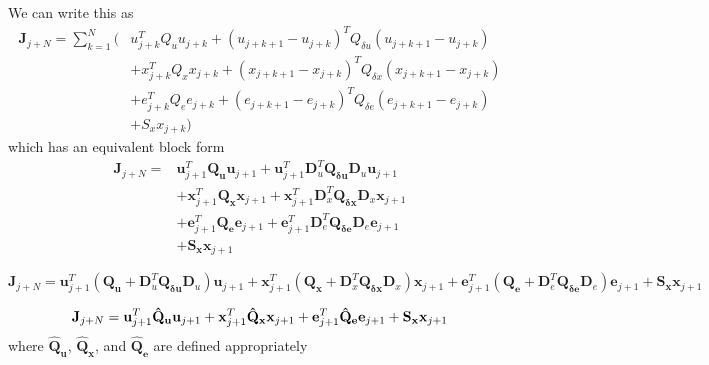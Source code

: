 \documentclass{article}
\begin{document}
We can write this as
\begin{equation}
\begin{split}
\mathbf{J}_{j+N} 
= \sum_{k=1}^{N}(
& u_{j+k}^T Q_u u_{j+k} + \left(u_{j+k+1}-u_{j+k}\right)^T Q_{\delta u} \left(u_{j+k+1}-u_{j+k}\right) \\
& + x_{j+k}^T Q_x x_{j+k} + \left(x_{j+k+1}-x_{j+k}\right)^T Q_{\delta x} \left(x_{j+k+1}-x_{j+k}\right) \\
& + e_{j+k}^T Q_e e_{j+k} + \left(e_{j+k+1}-e_{j+k}\right)^T Q_{\delta e} \left(e_{j+k+1}-e_{j+k}\right) \\
& + S_x x_{j+k})
\end{split}
\end{equation}
which has an equivalent block form
\begin{equation}
\begin{split}
\mathbf{J}_{j+N} = 
& \mathbf{u}_{j+1}^T \mathbf{Q_u} \mathbf{u}_{j+1} + \mathbf{u}_{j+1}^T \mathbf{D}_u^T \mathbf{Q_{\delta u}} \mathbf{D}_u \mathbf{u}_{j+1}\\
&+\mathbf{x}_{j+1}^T \mathbf{Q_x} \mathbf{x}_{j+1} + \mathbf{x}_{j+1}^T \mathbf{D}_x^T \mathbf{Q_{\delta x}} \mathbf{D}_x \mathbf{x}_{j+1}\\
&+\mathbf{e}_{j+1}^T \mathbf{Q_e} \mathbf{e}_{j+1} + \mathbf{e}_{j+1}^T \mathbf{D}_e^T \mathbf{Q_{\delta e}} \mathbf{D}_e \mathbf{e}_{j+1}\\
&+\mathbf{S_x}\mathbf{x}_{j+1}
\end{split}
\end{equation}

\begin{equation}
\mathbf{J}_{j+N} = 
 \mathbf{u}_{j+1}^T \left(\mathbf{Q_u} + \mathbf{D}_u^T\mathbf{Q_{\delta u}} \mathbf{D}_u\right) \mathbf{u}_{j+1}
+\mathbf{x}_{j+1}^T \left(\mathbf{Q_x} + \mathbf{D}_x^T\mathbf{Q_{\delta x}} \mathbf{D}_x \right)\mathbf{x}_{j+1}
+\mathbf{e}_{j+1}^T \left(\mathbf{Q_e} + \mathbf{D}_e^T\mathbf{Q_{\delta e}} \mathbf{D}_e \right)\mathbf{e}_{j+1}
+\mathbf{S_x}\mathbf{x}_{j+1}
\end{equation}

\begin{equation}
\mathbf{J}_{j+N} = 
\mathbf{u}_{j+1}^T \mathbf{\hat{Q}_u} \mathbf{u}_{j+1}\\
+\mathbf{x}_{j+1}^T \mathbf{\hat{Q}_x} \mathbf{x}_{j+1}\\
+\mathbf{e}_{j+1}^T \mathbf{\hat{Q}_e} \mathbf{e}_{j+1}\\
+\mathbf{S_x}\mathbf{x}_{j+1}
\end{equation}
where $\mathbf{\hat{Q}_u}$, $\mathbf{\hat{Q}_x}$, and $\mathbf{\hat{Q}_e}$ are defined appropriately
\end{document}
